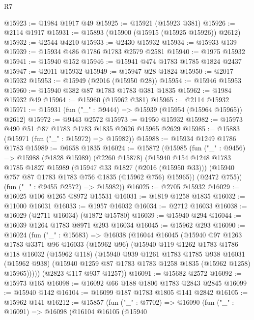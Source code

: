 \begin{lexlean}{R7}
\begin{coremodule}
@15923 := @1984 @1917 @49
@15925 := @15921 (@15923 @381)
@15926 := @2114 @1917
@15931 := @15893 (@15900 (@15915 (@15925 @15926)) @2612)
@15932 := @2544 @4210
@15933 := @2430 @15932
@15934 := @15933 @139
@15939 := @15934 @486 @1786 @1783 @2579 @2581
@15940 := @1975 @15932
@15941 := @15940 @152
@15946 := @15941 @474 @1783 @1785 @1824 @2437
@15947 := @2011 @15932
@15949 := @15947 @28 @1824
@15950 := @2017 @15932
@15953 := @15949 (@2016 (@15950 @28))
@15954 := @15946 @15953
@15960 := @15940 @382 @87 @1783 @1783 @381 @1835
@15962 := @1984 @15932 @49
@15964 := @15960 (@15962 @381)
@15965 := @2114 @15932
@15971 := @15931 (fun ("_" : @9444) => @15939 (@15954 (@15964 @15965)) @2612)
@15972 := @9443 @2572
@15973 := @1950 @15932
@15982 := @15973 @490 @51 @87 @1783 @1783 @1835 @2626 @15965 @2629
@15985 := @15883 (@15971 (fun ("_" : @15972) => @15982))
@15988 := @15934 @1249 @1786 @1783
@15989 := @6658 @1835
@16024 := @15872
    (@15985
      (fun ("_" : @9456) =>
      @15988
        (@1828 @15989)
        (@2260 @15878)
        (@15940
          @154
          @1248
          @1783
          @1785
          @1827
          @15989
          (@15947 @33 @1827 (@2016 (@15950 @33)))
          (@15940 @757 @87 @1783 @1783 @756 @1835 (@15962 @756) @15965))
        (@2472 @755))
      (fun ("_" : @9455 @2572) => @15982))
@16025 := @2705 @15932
@16029 := @16025 @106 @1265 @8972 @15531
@16031 := @1819 @1258 @1835
@16032 := @11000 @16031
@16033 := @1957 @16032
@16034 := @2712 @16033
@16038 := @16029 (@2711 @16034) (@1872 @15780)
@16039 := @15940 @294
@16044 := @16039 @1264 @1783 @8971 @293 @16034
@16045 := @15962 @293
@16090 := @16024
    (fun ("_" : @15683) =>
    @16038
      (@16044
        @16045
        (@15940
          @97
          @1263
          @1783
          @3371
          @96
          @16033
          (@15962 @96)
          (@15940
            @119
            @1262
            @1783
            @1786
            @118
            @16032
            (@15962 @118)
            (@15940
              @939
              @1261
              @1783
              @1785
              @938
              @16031
              (@15962 @938)
              (@15940 @1259 @87 @1783 @1783 @1258 @1835 (@15962 @1258) @15965)))))
      (@2823 @117 @937 @1257))
@16091 := @15682 @2572
@16092 := @15973 @165
@16098 := @16092 @66 @188 @1806 @1783 @2843 @2845
@16099 := @15940 @142
@16104 := @16099 @187 @1783 @1805 @141 @2842
@16105 := @15962 @141
@16212 := @15857
    (fun ("_" : @7702) =>
    @16090
      (fun ("_" : @16091) =>
      @16098
        (@16104
          @16105
          (@15940

\end{coremodule}
\end{lexlean}
